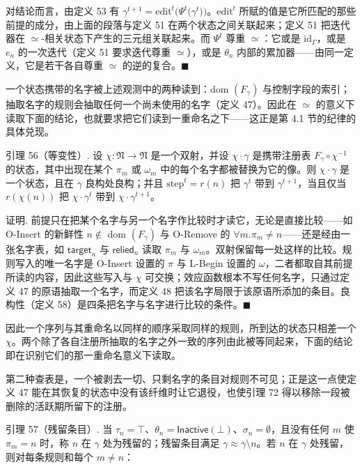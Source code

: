 \documentclass[
  10
]{article}
\begin{document}
对结论而言，由定义 53 有 $\gamma ^ { t + 1 } = \mathrm { e d i t } ^ { t } \big ( \Psi ^ { t } \big ( \gamma ^ { t } \big ) \big )$。$\mathrm{edit}^{t}$ 所赋的值是它所匹配的那些前提的成分，由上面的段落与定义 51 在两个状态之间关联起来；定义 51 把迭代器在 $\simeq$-相关状态下产生的三元组关联起来。而 $\Psi ^ { t }$ 尊重 $\simeq$：它或是 $\mathrm { i d } _ { \Gamma }$，或是 $e _ { n }$ 的一次迭代（定义 51 要求迭代尊重 $\simeq$），或是 $\theta _ { n }$ 内部的累加器——由同一定义，它是若干各自尊重 $\simeq$ 的逆的复合。$\blacksquare$

一个状态携带的名字被上述观测中的两种读到：dom $\left( F _ { \gamma } \right)$ 与控制字段的索引；抽取名字的规则会抽取任何一个尚未使用的名字（定义 47）。因此在 $\simeq$ 的意义下读取下面的结论，也就要求把它们读到一重命名之下——这正是第 4.1 节的纪律的具体兑现。

引理 56（等变性）. 设 $\chi : \mathfrak { N } \to \mathfrak { N }$ 是一个双射，并设 $\chi \cdot \gamma$ 是携带注册表 $F _ { \gamma } \circ \chi ^ { - 1 }$ 的状态，其中出现在某个 $\pi _ { m }$ 或 $\omega _ { m }$ 中的每个名字都被替换为它的像。则 $\chi \cdot \gamma$ 是一个状态，且在 $\gamma$ 良构处良构；并且 $\mathrm { s t e p } ^ { t } = r ( n )$ 把 $\gamma ^ { t }$ 带到 $\gamma ^ { t + 1 }$，当且仅当 $r ( \chi ( n ) )$ 把 $\chi \cdot \gamma ^ { t }$ 带到 $\chi \cdot \gamma ^ { t + 1 }$。

证明. 前提只在把某个名字与另一个名字作比较时才读它，无论是直接比较——如 O-Insert 的新鲜性 $n \not \in$ dom $\left( F _ { \gamma } \right)$ 与 O-Remove 的 $\forall m. \pi _ { m } \neq n$——还是经由一张名字表，如 $\mathsf{target}_{n}$ 与 $\mathsf{relied}_{n}$ 读取 $\pi _ { m }$ 与 $\omega _ { m }$。双射保留每一处这样的比较。规则写入的唯一名字是 O-Insert 设置的 $\pi$ 与 L-Begin 设置的 $\omega$，二者都取自其前提所读的内容，因此这些写入与 $\chi$ 可交换；效应函数根本不写任何名字，只通过定义 47 的原语抽取一个名字，而定义 48 把该名字局限于该原语所添加的条目。良构性（定义 58）是四条把名字与名字进行比较的条件。$\blacksquare$

因此一个序列与其重命名以同样的顺序采取同样的规则，所到达的状态只相差一个 $\chi$。两个除了各自注册所抽取的名字之外一致的序列由此被等同起来，下面的结论即在识别它们的那一重命名意义下读取。

第二种查表是，一个被剥去一切、只剩名字的条目对规则不可见；正是这一点使定义 47 能在其恢复的状态中没有该纤维时让它退役，也使引理 72 得以移除一段被删除的活跃期所留下的注册。

引理 57（残留条目）. 当 $\tau _ { n } = \top$、$\theta _ { n } = \mathsf { I n a c t i v e } ( \bot )$、$\sigma _ { n } = \emptyset$，且没有任何 $m$ 使 $\pi _ { m } = n$ 时，称 $n$ 在 $\gamma$ 处为残留的；残留条目满足 $\gamma \approx \gamma \setminus n$。若 $n$ 在 $\gamma$ 处残留，则对每条规则和每个 $m \neq n$：
\end{document}
